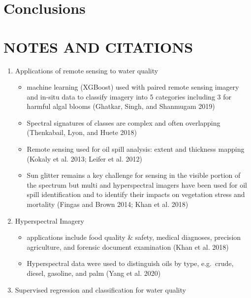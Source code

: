 \documentclass[
  letterpaper,
  DIV=11,
  numbers=noendperiod]{scrartcl}
\providecommand{\tightlist}{%
  \setlength{\itemsep}{0pt}\setlength{\parskip}{0pt}}\usepackage{longtable,booktabs,array}
\begin{document}
\section{Conclusions}\label{conclusions}

\section{NOTES AND CITATIONS}\label{notes-and-citations}

\begin{enumerate}
\def\labelenumi{\arabic{enumi}.}
\tightlist
\item
  Applications of remote sensing to water quality

  \begin{itemize}
  \tightlist
  \item
    machine learning (XGBoost) used with paired remote sensing imagery
    and in-situ data to classify imagery into 5 categories including 3
    for harmful algal blooms (Ghatkar, Singh, and Shanmugam 2019)
  \item
    Spectral signatures of classes are complex and often overlapping
    (Thenkabail, Lyon, and Huete 2018)
  \item
    Remote sensing used for oil spill analysis: extent and thickness
    mapping (Kokaly et al. 2013; Leifer et al. 2012)
  \item
    Sun glitter remains a key challenge for sensing in the visible
    portion of the spectrum but multi and hyperspectral imagers have
    been used for oil spill identification and to identify their impacts
    on vegetation stress and mortality (Fingas and Brown 2014; Khan et
    al. 2018)
  \end{itemize}
\item
  Hyperspectral Imagery

  \begin{itemize}
  \tightlist
  \item
    applications include food quality \& safety, medical diagnoses,
    precision agriculture, and forensic document examination (Khan et
    al. 2018)
  \item
    Hyperspectral data were used to distinguish oils by type,
    e.g.~crude, diesel, gasoline, and palm (Yang et al. 2020)
  \end{itemize}
\item
  Supervised regression and classification for water quality


\end{enumerate}
\end{document}
